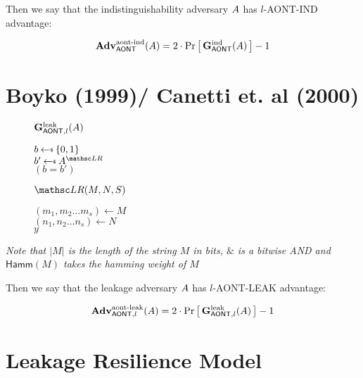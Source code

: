 \documentclass[11pt,twoside]{article}
\begin{document}
Then we say that the indistinguishability adversary $A$ has $l$-AONT-IND advantage: 

$$\textbf{Adv}^\text{aont-ind}_\mathsf{AONT}(A)=2\cdot{\Pr\left[\,{\mathbf{G}_{\mathsf{AONT}}^\text{ind}(A)}\,\right]} - 1$$

\section{Boyko (1999)/ Canetti et. al (2000)}

\begin{figure}[H]
{
\underline{$\mathbf{G}_{\mathsf{AONT},l}^\text{leak}(A)$}

\begin{algorithm}[H]
$b \getsr \bits$\\
$b' \getsr \advA^{\LRO}$\\
\Return $(b=b')$
\end{algorithm}

\smallskip
\underline{$\LRO(M,N,S)$}

\begin{algorithm}[H]
$(m_1,m_2\dots m_s)\gets M$\\
$(n_1,n_2\dots n_s)\gets N$\\
\Return $y$
\end{algorithm}
}
\end{figure}

\emph{Note that $|M|$ is the length of the string $M$ in bits, $\mathrel{\&}$ is a bitwise AND and $\mathsf{Hamm}(M)$ takes the hamming weight of $M$}

Then we say that the leakage adversary $A$ has $l$-AONT-LEAK advantage: 

$$\textbf{Adv}^\text{aont-leak}_{\mathsf{AONT},l}(A)=2\cdot{\Pr\left[\,{\mathbf{G}_{\mathsf{AONT},l}^\text{leak}(A)}\,\right]} - 1$$

\section{Leakage Resilience Model} 
\end{document}
